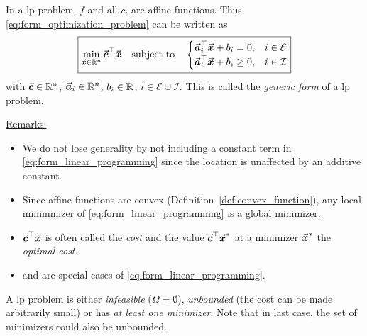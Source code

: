 In a \gls{lp} problem, \(f\) and all \(c_i\) are affine functions.
Thus \eqref{eq:form_optimization_problem} can be written as
\begin{equation}\label{eq:form_linear_programming}
  \boxed{
  \min_{\vec{\boldsymbol{x}} \in \mathbb{R}^{n}} \vec{\boldsymbol{c}}^\top \vec{\boldsymbol{x}} \quad \text{subject to} \quad
    \begin{cases}
      \vec{\boldsymbol{a}}_i^\top \vec{\boldsymbol{x}} + b_i = 0, & i \in \mathcal{E} \\
      \vec{\boldsymbol{a}}_i^\top \vec{\boldsymbol{x}} + b_i \geq 0, & i \in \mathcal{I}
    \end{cases}
     }
\end{equation}
with \(\vec{\boldsymbol{c}} \in \mathbb{R}^{n}\), \(\vec{\boldsymbol{a}}_i \in \mathbb{R}^{n}\), \(b_i \in \mathbb{R}\), \(i\in\mathcal{E}\cup\mathcal{I}\).
This is called the \emph{generic form} of a \gls{lp} problem.

\underline{Remarks:}
\begin{itemize}
\item We do not lose generality by not including a constant term in \eqref{eq:form_linear_programming} since the location is unaffected by an additive constant.
\item Since affine functions are convex (Definition~\ref{def:convex_function}), any local minimmizer of \eqref{eq:form_linear_programming} is a global minimizer.
\item \(\vec{\boldsymbol{c}}^\top \vec{\boldsymbol{x}}\) is often called the \emph{cost} and the value \(\vec{\boldsymbol{c}}^\top \vec{\boldsymbol{x}}^{\ast}\) at a minimizer \(\vec{\boldsymbol{x}}^{\ast}\) the \emph{optimal cost}.
\item {} and  are special cases of \eqref{eq:form_linear_programming}.
\end{itemize}

A \gls{lp} problem is either \emph{infeasible} ($\Omega = \emptyset$), \emph{unbounded} (the cost can be made arbitrarily small) or has \emph{at least one minimizer}.
Note that in last case, the set of minimizers could also be unbounded.


